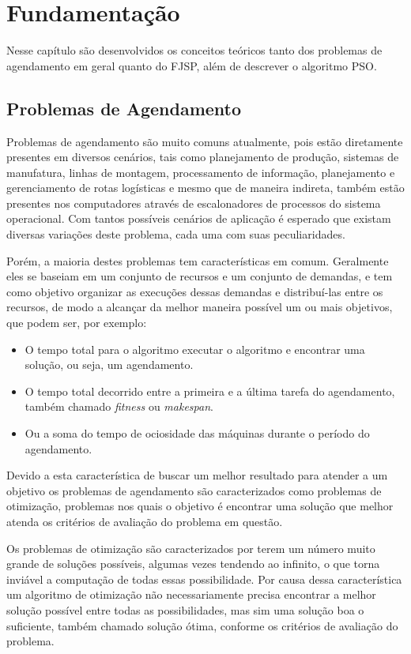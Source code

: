 \chapter{Fundamentação}
Nesse capítulo são desenvolvidos os conceitos teóricos tanto dos problemas de agendamento em geral quanto do FJSP, além de descrever o algoritmo PSO.

\section{Problemas de Agendamento}
Problemas de agendamento são muito comuns atualmente, pois estão diretamente presentes em diversos cenários, tais como planejamento de produção, sistemas de manufatura, linhas de montagem, processamento de informação, planejamento e gerenciamento de rotas logísticas e mesmo que de maneira indireta, também estão presentes nos computadores através de escalonadores de processos do sistema operacional.
%
Com tantos possíveis cenários de aplicação é esperado que existam diversas variações deste problema, cada uma com suas peculiaridades.


\indent Porém, a maioria destes problemas tem características em comum. Geralmente eles se baseiam em um conjunto de recursos e um conjunto de demandas, e tem como objetivo organizar as execuções dessas demandas e distribuí-las entre os recursos, de modo a alcançar da melhor maneira possível um ou mais objetivos, que podem ser, por exemplo: 
\begin{itemize}
    \item O tempo total para o algoritmo executar o algoritmo e encontrar uma solução, ou seja, um agendamento.
    \item O tempo total decorrido entre a primeira e a última tarefa do agendamento, também chamado \textit{fitness} ou \textit{makespan}.
    \item Ou a soma do tempo de ociosidade das máquinas durante o período do agendamento.
\end{itemize}

Devido a esta característica de buscar um melhor resultado para atender a um objetivo os problemas de agendamento são caracterizados como problemas de otimização, problemas nos quais o objetivo é encontrar uma solução que melhor atenda os critérios de avaliação do problema em questão.


\indent Os problemas de otimização são caracterizados por terem um número muito grande de soluções possíveis, algumas vezes tendendo ao infinito, o que torna inviável a computação de todas essas possibilidade. Por causa dessa característica um algoritmo de otimização não necessariamente precisa encontrar a melhor solução possível entre todas as possibilidades, mas sim uma solução boa o suficiente, também chamado solução ótima, conforme os critérios de avaliação do problema.


